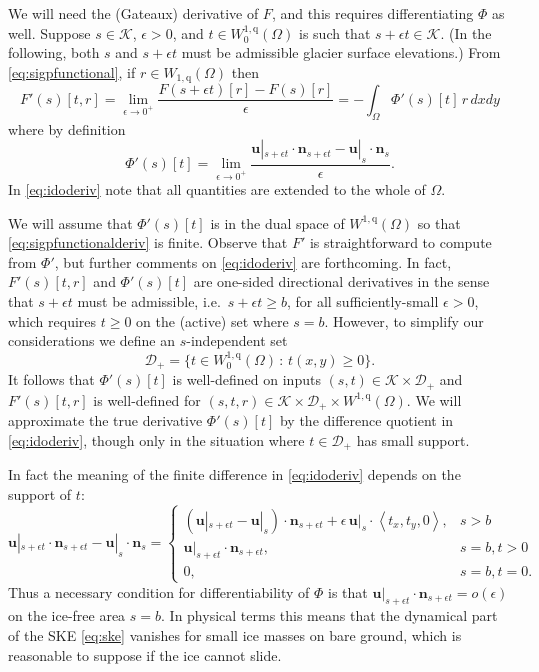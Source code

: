\documentclass[letterpaper,final,12pt,reqno]{amsart}
\theoremstyle{claim}
\newcommand{\eps}{\epsilon}
\newcommand{\bn}{\mathbf{n}}
\newcommand{\bu}{\mathbf{u}}
\newcommand{\qq}{{\text{q}}}
\newcommand{\bus}{\bu|_s}
\numberwithin{equation}{section}
\numberwithin{figure}{section}
\numberwithin{table}{section}
\numberwithin{theorem}{section}
\begin{document}
We will need the (Gateaux) derivative of $F$, and this requires differentiating $\Phi$ as well.  Suppose $s\in \mathcal{K}$, $\eps>0$, and $t \in W_0^{1,\qq}(\Omega)$ is such that $s+\eps t \in \mathcal{K}$.  (In the following, both $s$ and $s+\eps t$ must be admissible glacier surface elevations.)  From \eqref{eq:sigpfunctional}, if $r\in W_{1,\qq}(\Omega)$ then
\begin{equation}
F'(s)[t,r] = \lim_{\eps\to 0^+} \frac{F(s+\eps t)[r] - F(s)[r]}{\eps} = - \int_\Omega \Phi'(s)[t]\, r \,dx dy \label{eq:sigpfunctionalderiv}
\end{equation}
where by definition
\begin{equation}
\Phi'(s)[t] = \lim_{\eps\to 0^+} \frac{\bu|_{s+\eps t} \cdot \bn_{s+\eps t} - \bus \cdot \bn_s}{\eps}. \label{eq:idoderiv}
\end{equation}
In \eqref{eq:idoderiv} note that all quantities are extended to the whole of $\Omega$.

We will assume that $\Phi'(s)[t]$ is in the dual space of $W^{1,\qq}(\Omega)$ so that \eqref{eq:sigpfunctionalderiv} is finite.  Observe that $F'$ is straightforward to compute from $\Phi'$, but further comments on \eqref{eq:idoderiv} are forthcoming.  In fact, $F'(s)[t,r]$ and $\Phi'(s)[t]$ are one-sided directional derivatives in the sense that $s+\eps t$ must be admissible, i.e.~$s+\eps t\ge b$, for all sufficiently-small $\eps>0$, which requires $t\ge 0$ on the (active) set where $s=b$.  However, to simplify our considerations we define an $s$-independent set
\begin{equation}
\mathcal{D}_+ = \{t \in W_0^{1,\qq}(\Omega) \,:\, t(x,y) \ge 0\}. \label{eq:infdefectset}
\end{equation}
It follows that $\Phi'(s)[t]$ is well-defined on inputs $(s,t) \in \mathcal{K} \times \mathcal{D}_+$ and $F'(s)[t,r]$ is well-defined for $(s,t,r) \in \mathcal{K} \times \mathcal{D}_+ \times W^{1,\qq}(\Omega)$.  We will approximate the true derivative $\Phi'(s)[t]$ by the difference quotient in \eqref{eq:idoderiv}, though only in the situation where $t \in \mathcal{D}_+$ has small support.

In fact the meaning of the finite difference in \eqref{eq:idoderiv} depends on the support of $t$:
\begin{equation}
\bu|_{s+\eps t} \cdot \bn_{s+\eps t} - \bus \cdot \bn_s = \begin{cases}
           (\bu|_{s+\eps t} - \bus) \cdot \bn_{s+\eps t} + \eps\, \bus \cdot \left<t_x,t_y,0\right>, & s > b \\
           \bu|_{s+\eps t} \cdot \bn_{s+\eps t}, & s=b, t > 0 \\
           0, & s=b, t = 0.
                 \end{cases} \label{eq:differencecases}
\end{equation}
Thus a necessary condition for differentiability of $\Phi$ is that $\bu|_{s+\eps t} \cdot \bn_{s+\eps t} = o(\eps)$ on the ice-free area $s=b$.  In physical terms this means that the dynamical part of the SKE \eqref{eq:ske} vanishes for small ice masses on bare ground, which is reasonable to suppose if the ice cannot slide.
\end{document}
